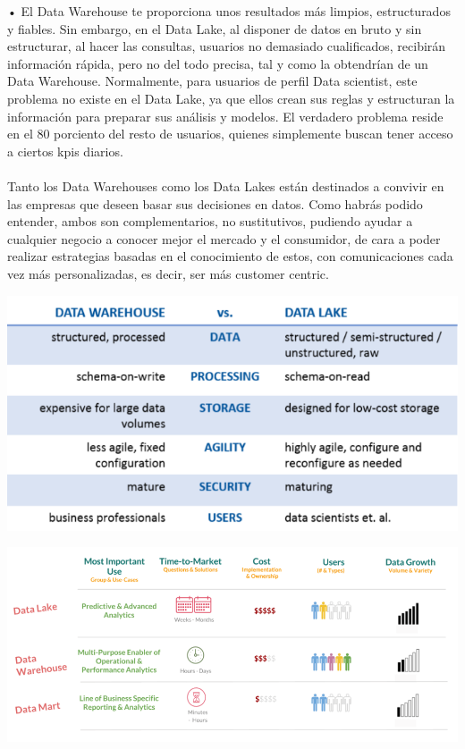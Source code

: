 {•	El Data Warehouse te proporciona unos resultados más limpios, estructurados y fiables. Sin embargo, en el Data Lake, al disponer de datos en bruto y sin estructurar, al hacer las consultas, usuarios no demasiado cualificados, recibirán información rápida, pero no del todo precisa, tal y como la obtendrían de un Data Warehouse. Normalmente, para usuarios de perfil Data scientist, este problema no existe en el Data Lake, ya que ellos crean sus reglas y estructuran la información para preparar sus análisis y modelos. El verdadero problema reside en el 80 porciento del resto de usuarios, quienes simplemente buscan tener acceso a ciertos kpis diarios.\\\\
Tanto los Data Warehouses como los Data Lakes están destinados a convivir en las empresas que deseen basar sus decisiones en datos. Como habrás podido entender, ambos son complementarios, no sustitutivos, pudiendo ayudar a cualquier negocio a conocer mejor el mercado y el consumidor, de cara a poder realizar estrategias basadas en el conocimiento de estos, con comunicaciones cada vez más personalizadas, es decir, ser más customer centric.
}
\begin{center}
\includegraphics[width=14cm]{./Imagenes/imagen1}
\end{center}

\begin{center}
\includegraphics[width=14cm]{./Imagenes/imagen2}
\end{center}

